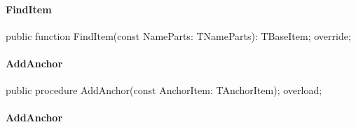 \documentclass{report}
\newif\ifpdf
\begin{document}
\paragraph*{FindItem}\hspace*{\fill}

\label{PasDoc_Items.TExternalItem-FindItem}
\begin{list}{}{
\setlength{\itemindent}{0cm}
\setlength{\listparindent}{0cm}
\setlength{\leftmargin}{\evensidemargin}
\addtolength{\leftmargin}{\tmplength}
\settowidth{\labelsep}{X}
\addtolength{\leftmargin}{\labelsep}
\setlength{\labelwidth}{\tmplength}
}
\item[\textbf{Declaration}\hfill]
\ifpdf
\begin{flushleft}
\fi
\begin{ttfamily}
public function FindItem(const NameParts: TNameParts): TBaseItem; override;\end{ttfamily}

\ifpdf
\end{flushleft}
\fi

\end{list}
\paragraph*{AddAnchor}\hspace*{\fill}

\label{PasDoc_Items.TExternalItem-AddAnchor}
\begin{list}{}{
\setlength{\itemindent}{0cm}
\setlength{\listparindent}{0cm}
\setlength{\leftmargin}{\evensidemargin}
\addtolength{\leftmargin}{\tmplength}
\settowidth{\labelsep}{X}
\addtolength{\leftmargin}{\labelsep}
\setlength{\labelwidth}{\tmplength}
}
\item[\textbf{Declaration}\hfill]
\ifpdf
\begin{flushleft}
\fi
\begin{ttfamily}
public procedure AddAnchor(const AnchorItem: TAnchorItem); overload;\end{ttfamily}

\ifpdf
\end{flushleft}
\fi

\end{list}
\paragraph*{AddAnchor}\hspace*{\fill}
\end{document}
